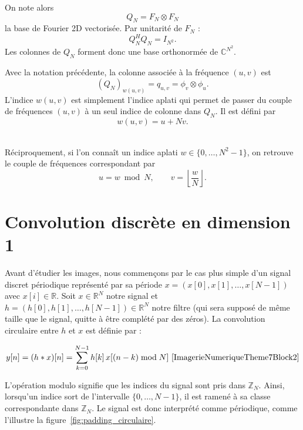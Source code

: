 On note alors
\begin{equation}
    Q_N = F_N \otimes F_N
    \label{eq:def_base_fourier_2d_vectorisee}
\end{equation}
la base de Fourier 2D vectorisée. Par unitarité de $F_N$ :
\[
    Q_N^H Q_N = I_{N^2}.
\]
Les colonnes de $Q_N$ forment donc une base orthonormée de $\mathbb{C}^{N^2}$.

Avec la notation précédente, la colonne associée à la fréquence $(u,v)$ est
\[
    (Q_N)_{w(u,v)}
    =
    q_{u,v}
    =
    \phi_v\otimes\phi_u.
\]
L'indice $w(u,v)$ est simplement l'indice aplati qui permet de passer du couple de fréquences
$(u,v)$ à un seul indice de colonne dans $Q_N$. Il est défini par
\begin{equation}
    w(u,v)=u+Nv.
    \label{eq:indice_frequence_aplati}
\end{equation}\

Réciproquement, si l'on connaît un indice aplati $w\in\{0,\dots,N^2-1\}$, on retrouve le couple
de fréquences correspondant par
\[
    u = w \bmod N,
    \qquad
    v = \left\lfloor \frac{w}{N} \right\rfloor.
\]

\section{Convolution discrète en dimension 1}

Avant d'étudier les images, nous commençons par le cas plus simple d'un signal discret périodique représenté 
par sa période $x = (x[0], x[1], \ldots, x[N-1])$ avec $x[i] \in \mathbb{R}$.
Soit $x \in \mathbb{R}^N$ notre signal et $h = (h[0], h[1], \ldots, h[N-1]) \in \mathbb{R}^N$ notre filtre (qui sera 
supposé de même taille que le signal, quitte à être complété par des zéros). 
La convolution circulaire entre $h$ et $x$ est définie par :

\[
y[n] = (h * x)[n] = \sum_{k=0}^{N-1} h[k]\,x[(n-k) \bmod N] \text{~\cite{ImagerieNumeriqueTheme7Block2}}
\]

L'opération modulo signifie que les indices du signal sont pris dans 
\(\mathbb{Z}_N\). 
Ainsi, lorsqu'un indice sort de l'intervalle \(\{0,\ldots,N-1\}\), 
il est ramené à sa classe correspondante dans \(\mathbb{Z}_N\).
Le signal est donc interprété comme périodique, comme l'illustre la 
figure~\ref{fig:padding_circulaire}. 

